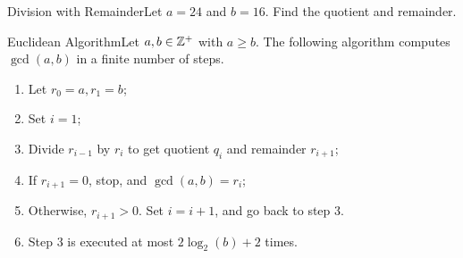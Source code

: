 \begin{example}
    {Division with Remainder}Let \(a = 24\) and \(b = 16\). Find the quotient and remainder.
\end{example}
\newpage
\begin{theorem}
    {Euclidean Algorithm}Let \(a,b \in \mathbb{Z}^+\) with \(a \geq b\). The following algorithm computes \(\gcd(a,b)\) in a finite number of steps. \begin{enumerate}
        \item Let \(r_0 = a, r_1 = b\);
        \item Set \(i = 1\);
        \item Divide \(r_{i - 1}\) by \(r_i\) to get quotient \(q_i\) and remainder \(r_{i + 1}\);
        \item If \(r_{i + 1} = 0\), stop, and \(\gcd(a,b) = r_i\);
        \item Otherwise, \(r_{i + 1} > 0\). Set \(i = i + 1\), and go back to step 3.
        \item Step 3 is executed at most \(2\log_2(b) + 2\) times.
    \end{enumerate}
\end{theorem}




